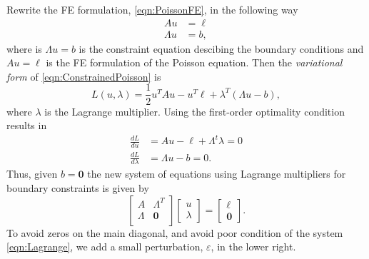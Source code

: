 Rewrite the FE formulation, \eqref{eqn:PoissonFE}, in the following way
\begin{equation}
  \begin{split}
    A u &= \ell \\
    \Lambda u &= b,
  \end{split}
  \label{eqn:ConstrainedPoisson}
\end{equation}
where is $\Lambda u = b$ is the constraint equation descibing the boundary
conditions and $A u = \ell$ is the FE formulation of the Poisson equation.
Then the \emph{variational form} of \eqref{eqn:ConstrainedPoisson} is
\begin{equation}
  L(u,\lambda) = \frac{1}{2}u^T A u - u^T \ell + \lambda^T (\Lambda u - b),
  \label{eqn:Variational}
\end{equation}
where $\lambda$ is the Lagrange multiplier. Using the first-order optimality
condition results in
\begin{equation}
  \begin{split}
    \frac{d L}{du} &= Au - \ell + \Lambda^t \lambda = 0 \\
    \frac{d L}{d\lambda} &= \Lambda u - b = 0.
  \end{split}
  \label{eqn:Condition}
\end{equation}
Thus, given $b = \mathbf{0}$ the new system of equations using Lagrange
multipliers for boundary constraints is given by
\begin{equation}
  \begin{bmatrix}
    A & \Lambda^T \\
    \Lambda &  \mathbf{0} \\
  \end{bmatrix} \begin{bmatrix}
    u \\ \lambda
  \end{bmatrix} = \begin{bmatrix}
    \ell \\ \mathbf{0}
  \end{bmatrix}.
  \label{eqn:Lagrange}
\end{equation}
To avoid zeros on the main diagonal, and avoid poor condition of the system
\eqref{eqn:Lagrange}, we add a small perturbation, $\varepsilon$, in the lower
right.
